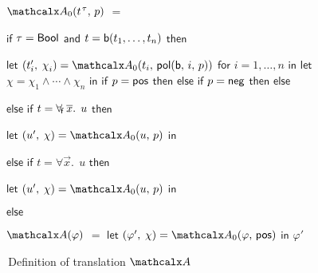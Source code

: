 \begin{figure}[t]
\normalsize
\begin{enumerate}
\itemx[\ ]
$\conv_0( t\typ{\tau},\, p )$ $=$
 \begin{itemize}
   \itemx[] $\mathsf{if}$ $\tau = \mathsf{Bool}$ $\mathsf{and}$ $t = \mathsf{b}(t_1,\ldots,t_n)$ $\mathsf{then}$
    \begin{itemize}
      \itemx[] $\mathsf{let}$ $( t'_i,\, \chi_i ) = \conv_0( t_i,\, \pol( \boolop,\, i,\, p ) )$ $\mathsf{for}$ $i = 1, \ldots, n$ $\mathsf{in}$%
      \itemx[] $\mathsf{let}$ $\chi = \chi_1 \wedge \cdots \wedge \chi_n$ $\mathsf{in}$
      \itemx[] $\mathsf{if}$ $p = \mathsf{pos}$ $\mathsf{then}$ 
      \itemx[] $\mathsf{else}$ $\mathsf{if}$ $p = \mathsf{neg}$ $\mathsf{then}$ 
      \itemx[] $\mathsf{else}$ 
    \end{itemize}
  \itemx[] $\mathsf{else}$ $\mathsf{if}$ $t = \forall_{\!\mathsf{f}\:} \overline{x}.\;\, u$ $\mathsf{then}$
    \begin{itemize}
      \itemx[] $\mathsf{let}$ $( u',\, \chi ) = \conv_0( u,\, p )$ $\mathsf{in}$ 
    \end{itemize}
  \itemx[] $\mathsf{else}$ $\mathsf{if}$ $t = \forall \vec x.\;\, u$ $\mathsf{then}$
    \begin{itemize}
      \itemx[] $\mathsf{let}$ $( u',\, \chi ) = \conv_0( u,\, p )$ $\mathsf{in}$ 
    \end{itemize}
   \itemx[] $\mathsf{else}$
   \begin{itemize}
     \itemx[] \return {}
   \end{itemize}
 \end{itemize}
\end{enumerate}
\begin{enumerate}
\itemx[\ ]
$\conv( \varphi )$ $=$ $\mathsf{let}$ $( \varphi',\, \chi ) = \conv_0( \varphi,\, \ppos )$ $\mathsf{in}$ $\varphi'$
\end{enumerate}
\caption{\,Definition of translation $\conv$}
\label{fig:A}
\end{figure}

